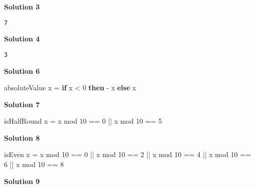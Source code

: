 \documentclass[11pt,
  american,
  DIV13]{article}
\newenvironment{Shaded}{}{}
\newcommand{\DecValTok}[1]{\textcolor[rgb]{0.25,0.63,0.44}{#1}}
\newcommand{\KeywordTok}[1]{\textcolor[rgb]{0.00,0.44,0.13}{\textbf{#1}}}
\newcommand{\NormalTok}[1]{#1}
\newcommand{\OperatorTok}[1]{\textcolor[rgb]{0.40,0.40,0.40}{#1}}
\newcommand{\OtherTok}[1]{\textcolor[rgb]{0.00,0.44,0.13}{#1}}
\begin{document}
\textbf{Solution 3}

\begin{verbatim}
7
\end{verbatim}

\textbf{Solution 4}

\begin{verbatim}
3
\end{verbatim}

\textbf{Solution 6}

\begin{Shaded}
\begin{Highlighting}[]
\NormalTok{absoluteValue x }\OtherTok{=} \KeywordTok{if}\NormalTok{ x }\OperatorTok{\textless{}} \DecValTok{0} \KeywordTok{then} \OperatorTok{{-}}\NormalTok{ x }\KeywordTok{else}\NormalTok{ x}
\end{Highlighting}
\end{Shaded}

\textbf{Solution 7}

\begin{Shaded}
\begin{Highlighting}[]
\NormalTok{isHalfRound x }\OtherTok{=}\NormalTok{ x }\OtherTok{\textasciigrave{}mod\textasciigrave{}} \DecValTok{10} \OperatorTok{==} \DecValTok{0} \OperatorTok{||}\NormalTok{ x }\OtherTok{\textasciigrave{}mod\textasciigrave{}} \DecValTok{10} \OperatorTok{==} \DecValTok{5}
\end{Highlighting}
\end{Shaded}

\textbf{Solution 8}

\begin{Shaded}
\begin{Highlighting}[]
\NormalTok{isEven x }\OtherTok{=}\NormalTok{ x }\OtherTok{\textasciigrave{}mod\textasciigrave{}} \DecValTok{10} \OperatorTok{==} \DecValTok{0} \OperatorTok{||}\NormalTok{ x }\OtherTok{\textasciigrave{}mod\textasciigrave{}} \DecValTok{10} \OperatorTok{==} \DecValTok{2} \OperatorTok{||}\NormalTok{ x }\OtherTok{\textasciigrave{}mod\textasciigrave{}} \DecValTok{10} \OperatorTok{==} \DecValTok{4} \OperatorTok{||}\NormalTok{ x }\OtherTok{\textasciigrave{}mod\textasciigrave{}} \DecValTok{10} \OperatorTok{==} \DecValTok{6} \OperatorTok{||}\NormalTok{ x }\OtherTok{\textasciigrave{}mod\textasciigrave{}} \DecValTok{10} \OperatorTok{==} \DecValTok{8}
\end{Highlighting}
\end{Shaded}

\textbf{Solution 9}
\end{document}
